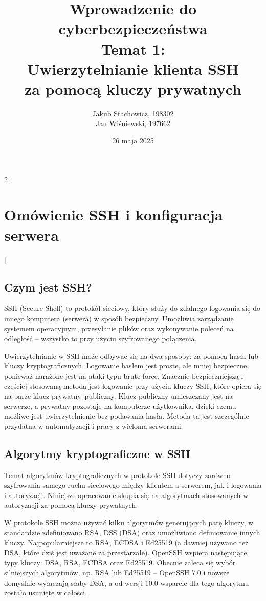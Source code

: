 \documentclass{article}
\title{Wprowadzenie do cyberbezpieczeństwa\\Temat 1:\\Uwierzytelnianie klienta SSH\\za pomocą kluczy prywatnych}
\author{Jakub Stachowicz, 198302\\Jan Wiśniewski, 197662}
\date{26 maja 2025}
\begin{document}
\maketitle
\newpage
\tableofcontents
\newpage


\begin{multicols}{2}
[
\section{Omówienie SSH i konfiguracja serwera}
]
\subsection{Czym jest SSH?}
SSH (Secure Shell) to protokół sieciowy, który służy do zdalnego logowania się do innego komputera (serwera) w sposób bezpieczny. Umożliwia zarządzanie systemem operacyjnym, przesyłanie plików oraz wykonywanie poleceń na odległość -- wszystko to przy użyciu szyfrowanego połączenia\cite[The SSH protocol]{whatisssh}.

Uwierzytelnianie w SSH może odbywać się na dwa sposoby: za pomocą hasła lub kluczy kryptograficznych. Logowanie hasłem jest proste, ale mniej bezpieczne, ponieważ narażone jest na ataki typu brute-force. Znacznie bezpieczniejszą i częściej stosowaną metodą jest logowanie przy użyciu kluczy SSH, które opiera się na parze klucz prywatny–publiczny. Klucz publiczny umieszczany jest na serwerze, a prywatny pozostaje na komputerze użytkownika, dzięki czemu możliwe jest uwierzytelnienie bez podawania hasła. Metoda ta jest szczególnie przydatna w automatyzacji i pracy z wieloma serwerami\cite[Automate with SSH keys, but manage them]{whatisssh}.

\subsection{Algorytmy kryptograficzne w SSH}
Temat algorytmów kryptograficznych w protokole SSH dotyczy zarówno szyfrowania samego ruchu sieciowego między klientem a serwerem, jak i logowania i autoryzacji. Niniejsze opracowanie skupia się na algorytmach stosowanych w autoryzacji za pomocą kluczy prywatnych.

W protokole SSH można używać kilku algorytmów generujących parę kluczy, w standardzie zdefiniowano RSA, DSS (DSA) oraz umożliwiono definiowanie innych kluczy\cite[6.6.~s.~13]{rfc4253}. Najpopularniejsze to RSA, ECDSA i Ed25519 (a dawniej używano też DSA, które dziś jest uważane za przestarzałe). OpenSSH wspiera następujące typy kluczy: DSA, RSA, ECDSA oraz Ed25519\cite[User key generation]{learnms}. Obecnie zaleca się wybór silniejszych algorytmów, np. RSA lub Ed25519 -- OpenSSH 7.0 i nowsze domyślnie wyłączają słaby DSA, a od wersji 10.0 wsparcie dla tego algorytmu zostało usunięte w całości\cite{openssh10}.


\end{multicols}
\end{document}
